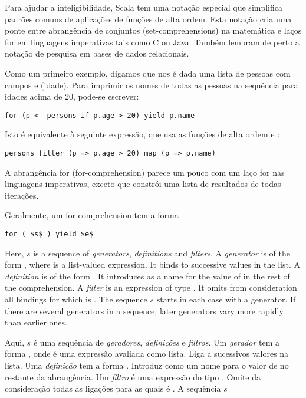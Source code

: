 Para ajudar a inteligibilidade, Scala tem uma notação especial que simplifica padrões comuns de aplicações 
de funções de alta ordem. Esta notação cria uma ponte entre abrangência de conjuntos (set-comprehensions) 
na matemática e laços for em linguagens imperativas tais como C ou Java. Também lembram de perto
a notação de pesquisa em bases de dados relacionais.  

Como um primeiro exemplo, digamos que nos é dada uma lista  de pessoas com campos  
e  (idade). Para imprimir os nomes de todas as pessoas na sequência para idades acima de $20$, 
pode-se escrever:
 
\begin{lstlisting}
for (p <- persons if p.age > 20) yield p.name
\end{lstlisting}
Isto é equivalente à seguinte expressão, que usa as funções de alta ordem  e : 
\begin{lstlisting}
persons filter (p => p.age > 20) map (p => p.name)
\end{lstlisting}
A abrangência for (for-comprehension) parece um pouco com um laço for nas linguagens imperativas, 
exceto que constrói uma lista de resultados de todas iterações.

Geralmente, um for-comprehension tem a forma
\begin{lstlisting}
for ( $s$ ) yield $e$
\end{lstlisting}
Here, $s$ is a sequence of {\em generators}, {\em definitions} and
{\em filters}.  A {\em generator} is of the form ,
where  is a list-valued expression. It binds  to
successive values in the list.  A {\em definition} is of the form
. It introduces  as a name for the value of
 in the rest of the comprehension. A {\em filter} is an
expression  of type .  It omits from
consideration all bindings for which  is .  The
sequence $s$ starts in each case with a generator.  If there are
several generators in a sequence, later generators vary more rapidly
than earlier ones.

Aqui, $s$ é uma sequência de {\em geradores}, {\em definições} e {\em filtros}. Um {\em gerador} tem a 
forma , onde  é uma expressão avaliada como lista. Liga  a sucessivos
valores na lista. Uma {\em definição} tem a forma . Introduz  como um nome para 
o valor de  no restante da abrangência. Um {\em filtro} é uma expressão  do tipo 
. Omite da consideração todas as ligações para as quais  é . A
sequência $s$

